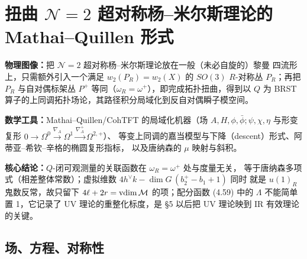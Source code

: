 
\section{扭曲 $\mathcal{N}=2$ 超对称杨--米尔斯理论的 Mathai--Quillen 形式}
\label{sec:mq-donaldson}

\begin{keytakeaways}
\item \textbf{物理图像：}把 $\mathcal{N}=2$ 超对称杨--米尔斯理论放在一般（未必自旋的）黎曼
  四流形上，只需额外引入一个满足 $w_2(P_R)=w_2(X)$ 的 $SO(3)$ $R$-对称丛 $P_R$；再把
  $P_R$ 与自对偶标架丛 $P^+$ 等同（$\omega_R=\omega^+$），即完成拓扑扭曲，得到以 $Q$ 为
  BRST 算子的上同调拓扑场论，其路径积分局域化到反自对偶瞬子模空间。
\item \textbf{数学工具：}Mathai--Quillen/CohTFT 的局域化机器（场 $A,H,\phi,\bar\phi;\psi,\chi,\eta$
  与形变复形 $0\to\Omega^0\xrightarrow{\nabla_A}\Omega^1\xrightarrow{\nabla^+_A}\Omega^{2,+}$）、
  等变上同调的嘉当模型与下降（descent）形式、阿蒂亚--希钦--辛格的椭圆复形指标，
  以及唐纳森的 $\mu$ 映射与斜积。
\item \textbf{核心结论：}$Q$-闭可观测量的关联函数在 $\omega_R=\omega^+$ 处与度量无关，
  等于唐纳森多项式（相差整体常数）；虚拟维数 $4h^\vee k-\dim G\,(b_2^+-b_1+1)$ 同时
  就是 $u(1)_R$ 鬼数反常，故只留下 $4\ell+2r=\operatorname{vdim}\mathcal{M}$ 的项；配分函数
  (4.59) 中的 $\Lambda$ 不能简单置 1，它记录了 UV 理论的重整化标度，是 §5 以后把 UV
  理论映到 IR 有效理论的关键。
\end{keytakeaways}


\subsection{场、方程、对称性}
\label{sec:4-1}

